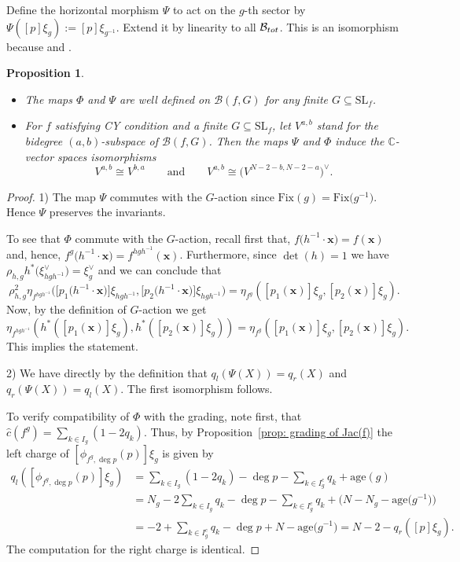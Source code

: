 \documentclass[10pt,a4paper]{article}
\numberwithin{equation}{section}
\newtheorem{Proposition}[Theorem]{Proposition}
 { \theoremstyle{definition}
\newtheorem{Definition}[Theorem]{Definition}
\newtheorem{Note}[Theorem]{Note}
\newtheorem{Example}[Theorem]{Example}
\newtheorem{Remark}[Theorem]{Remark} }
\newcommand{\CC}{{\mathbb{C}}}
\newcommand{\SL}{{\mathrm{SL}}}
\newcommand{\Jac}{\mathrm{Jac}}
\newcommand{\Fix}{\mathrm{Fix}}
\newcommand{\age}{\mathrm{age}}
\def\B{{\mathcal B}}
\begin{document}
Define the horizontal morphism $\Psi$ to act on the $g$-th sector by $\Psi([p] \xi_g) := [p] \xi_{g^{-1}}$.
Extend it by linearity to all $\B_{\rm tot}$.
This is an isomorphism because  and \smash{$\Jac(f^g) = \Jac\bigl(f^{g^{-1}}\bigr)$}.
\begin{Proposition}\label{proposition: Serre and Hodge under CY}\quad
\begin{itemize}\itemsep=0pt
\item[$(1)$] The maps $\Phi$ and $\Psi$ are well defined on $\B(f,G)$ for any finite $G \subseteq \SL_f$.
\item[$(2)$]	For $f$ satisfying CY condition and a finite $G \subseteq \SL_f$, let $V^{a,b}$ stand for the bidegree $(a,b)$-subspace of $\B(f,G)$.
	Then the maps $\Psi$ and $\Phi$ induce the $\CC$-vector spaces isomorphisms
	\[
		V^{a,b} \cong V^{b,a} \qquad \text{and} \qquad V^{a,b} \cong \bigl(V^{N-2-b,N-2-a}\bigr)^\vee.
	\]
\end{itemize}
\end{Proposition}
\begin{proof}
1) The map $\Psi$ commutes with the $G$-action since $\Fix(g)=\Fix\bigl(g^{-1}\bigr)$. Hence $\Psi$ preserves the invariants.

To see that $\Phi$ commute with the $G$-action, recall first that, $f\bigl(h^{-1}\cdot \mathbf{x}\bigr)=f(\mathbf{x})$ and, hence, $f^g\bigl(h^{-1}\cdot \mathbf{x}\bigr)=f^{hgh^{-1}}(\mathbf{x})$.
Furthermore, since $\det(h)=1$ we have $\rho_{h,g}h^*\bigl(\xi_{hgh^{-1}}^\vee\bigr)= \xi^\vee_g$ and we can conclude that
\[
\rho_{h,g}^{2}\eta_{f^{hgh^{-1}}}\bigl(\bigl[p_1\bigl(h^{-1}\cdot\mathbf{x}\bigr)\bigr]\xi_{hgh^{-1}},
\bigl[p_2\bigl(h^{-1}\cdot\mathbf{x}\bigr)\bigr]\xi_{hgh^{-1}}\bigr)=
\eta_{f^{g}}([p_1(\mathbf{x})]\xi_{g},[p_2(\mathbf{x})]\xi_{g}).
\]
Now, by the definition of $G$-action we get
\[
\eta_{f^{hgh^{-1}}}(h^*([p_1(\mathbf{x})]\xi_{g}),h^*([p_2(\mathbf{x})]\xi_{g}))=
\eta_{f^{g}}([p_1(\mathbf{x})]\xi_{g},[p_2(\mathbf{x})]\xi_{g}).
\]
This implies the statement.

2) We have directly by the definition that $q_l(\Psi(X)) = q_r(X)$ and $q_r(\Psi(X)) = q_l(X)$. The first isomorphism follows.

To verify compatibility of $\Phi$ with the grading, note first, that $\widehat{c}(f^g)=\sum_{k\in I_g}(1-2q_k)$. Thus, by Proposition~\ref{prop: grading of Jac(f)} the left charge of $[\phi_{f^g,\deg p}(p)]\xi_g$ is given by
\begin{align*}q_l([\phi_{f^g,\deg p}(p)]\xi_g) &= \sum_{k\in I_g}(1-2q_k)-\deg p- \sum_{k \in I_g^c} q_{k} + \age{(g)}
\\ &=N_g-2\sum_{k\in I_g} q_k-\deg p- \sum_{k \in I_g^c} q_{k}+\bigl(N-N_g-\age{\bigl(g^{-1}\bigr)}\bigr)
\\ &=-2+\sum_{k\in I^c_g} q_k-\deg p +N-\age{\bigl(g^{-1}\bigr)}=N-2-q_r([p]\xi_g).
\end{align*}
The computation for the right charge is identical.
\end{proof}
\end{document}
